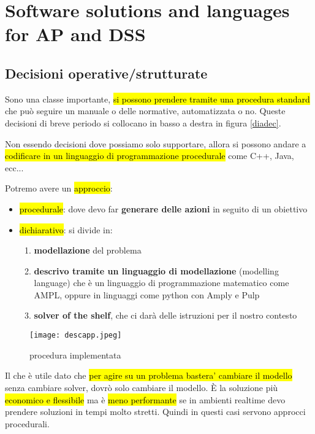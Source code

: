 \newpage
\section{Software solutions and languages for AP and DSS}


\subsection{Decisioni operative/strutturate}

Sono una classe importante, \hl{si possono prendere tramite una procedura standard} che può seguire un manuale o delle normative, automatizzata o no. Queste decisioni di breve periodo si collocano in basso a destra in figura  \ref{diadec}.

Non essendo decisioni dove possiamo solo supportare, allora si possono andare a \hl{codificare in un linguaggio di programmazione procedurale} come C++, Java, ecc...

Potremo avere un \hl{approccio}:

\begin{itemize}
	\item \hl{procedurale}: dove devo far \textbf{generare delle azioni} in seguito di un obiettivo
	
	\item \hl{dichiarativo}: si divide in:
		\begin{enumerate}
			\item \textbf{modellazione} del problema
			
			\item \textbf{descrivo tramite un linguaggio di modellazione} (modelling language) che è un linguaggio di programmazione matematico come AMPL, oppure in linguaggi come python con Amply e Pulp
			
			\item \textbf{solver of the shelf}, che ci darà delle istruzioni per il nostro contesto
		\end{enumerate}
\end{itemize}


\begin{figure}[H]
\centering
\texttt{[image: descapp.jpeg]}
\caption{procedura implementata} 
\label{descapp}
\end{figure}


Il che è utile dato che \hl{per agire su un problema bastera' cambiare il modello} senza cambiare solver, dovrò solo cambiare il modello. È la soluzione più \hl{economico e flessibile} ma è \hl{meno performante} se in ambienti realtime devo prendere soluzioni in tempi molto stretti. Quindi in questi casi servono approcci procedurali.

